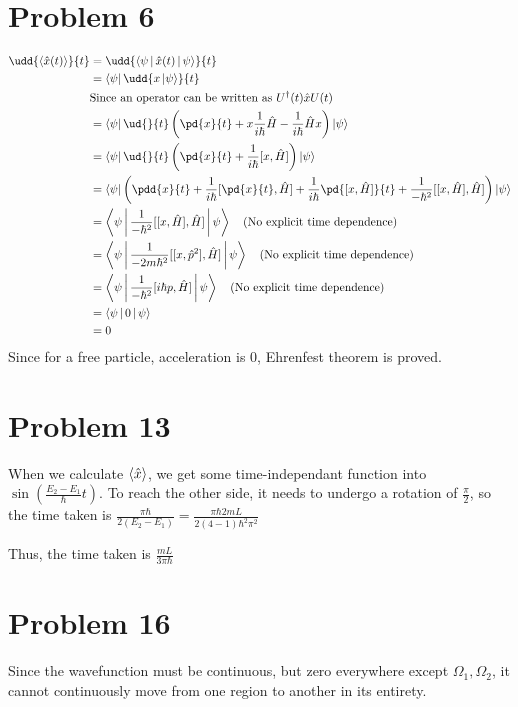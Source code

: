 \documentclass[12pt]{article}
\begin{document}
\section*{Problem 6}
\begin{align*}
\udd{\Braket{\hat x(t)}}{t}&=\udd{\Braket{\psi | \hat x(t) |\psi}}{t}\\
&=\Bra{\psi} \udd{x\Ket{\psi}}{t}\\
&\text{Since an operator can be written as }  U^{\dagger}(t)\hat xU(t)\\
&= \Bra{\psi}\ud{}{t}\left(\pd{x}{t}+x\frac1{i\hbar} \hat H-\frac1{i\hbar}\hat H x \right)\Ket{\psi}\\
&=\Bra{\psi}\ud{}{t}\left(\pd{x}{t}+\frac1{i\hbar}[x,\hat H]\right)\Ket{\psi}\\
&= \Bra{\psi}\left(\pdd{x}{t}+\frac{1}{i\hbar}[\pd{x}{t},\hat H] + \frac{1}{i\hbar}\pd{[x,\hat H]}{t}+\frac{1}{-\hbar^2}[[x,\hat H],\hat H]\right)\Ket{\psi}\\
&=\Braket{\psi|\frac{1}{-\hbar^2}[[x,\hat H],\hat H]|\psi}\quad  \text{(No explicit time dependence)}\\
&=\Braket{\psi|\frac{1}{-2m\hbar^2}[[x,\hat p^2],\hat H]|\psi}\quad  \text{(No explicit time dependence)}\\
&=\Braket{\psi|\frac{1}{-\hbar^2}[i\hbar p ,\hat H]|\psi}\quad  \text{(No explicit time dependence)}\\
&= \Braket{\psi|0|\psi}\\
&= 0
\end{align*}
Since for a free particle, acceleration is 0, Ehrenfest theorem is proved.

\section*{Problem 13}

When we calculate $\Braket{\hat x}$, we get some time-independant function into $\sin(\frac{E_2-E_1}{\hbar}t)$. To reach the other side, it needs to undergo a rotation of $\frac\pi2$, so the time taken is $
\frac{\pi\hbar}{2(E_2-E_1)}=\frac{\pi\hbar 2 m L}{2(4-1)\hbar^2\pi^2}$

Thus, the time taken is $\frac{mL}{3\pi\hbar}$

\section*{Problem 16}
Since the wavefunction must be continuous, but zero everywhere except $\Omega_1,\Omega_2$, it cannot continuously move from one region to another in its entirety.
\end{document}
